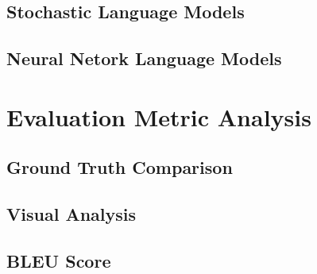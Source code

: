 \subsection{Stochastic Language Models}

\subsection{Neural Netork Language Models}


\section{Evaluation Metric Analysis}

\subsection{Ground Truth Comparison}

\subsection{Visual Analysis}

\subsection{BLEU Score}
\cite{Callison-Burch}

